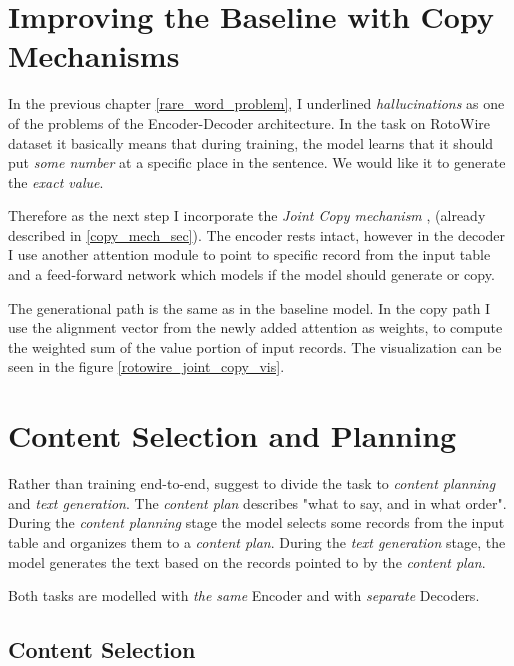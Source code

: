\section{Improving the Baseline with Copy Mechanisms} \label{section:copy_mechanism_intro}

In the previous chapter \ref{rare_word_problem}, I underlined \emph{hallucinations} as one of the problems of the Encoder-Decoder architecture. In the task on RotoWire dataset it basically means that during training, the model learns that it should put \emph{some number} at a specific place in the sentence. We would like it to generate the \emph{exact value}.

Therefore as the next step I incorporate the \emph{Joint Copy mechanism} \citep{gu2016incorporating}, \citep{yang2016referenceaware} (already described in \ref{copy_mech_sec}). The encoder rests intact, however in the decoder I use another attention module to point to specific record from the input table and a feed-forward network which models if the model should generate or copy.

The generational path is the same as in the baseline model. In the copy path I use the alignment vector from the newly added attention as weights, to compute the weighted sum of the value portion of input records. The visualization can be seen in the figure \ref{rotowire_joint_copy_vis}.

\section{Content Selection and Planning}

Rather than training end-to-end, \citep{puduppully2019datatotext} suggest to divide the task to \emph{content planning} and \emph{text generation}. The \emph{content plan} describes "what to say, and in what order". During the \emph{content planning} stage the model selects some records from the input table and organizes them to a \emph{content plan}. During the \emph{text generation} stage, the model generates the text based on the records pointed to by the \emph{content plan}.

Both tasks are modelled with \emph{the same} Encoder and with \emph{separate} Decoders.

\subsection{Content Selection} \label{subsection:content_selection}


